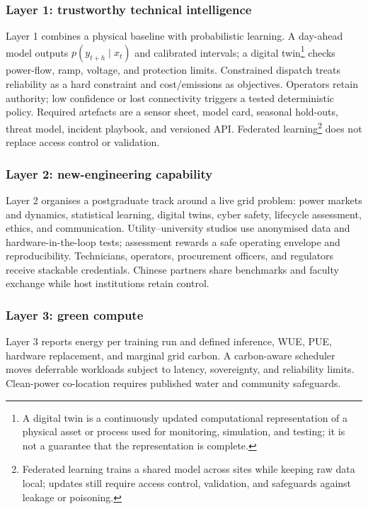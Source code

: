 \documentclass[12pt]{article}
\begin{document}
\subsubsection{Layer 1: trustworthy technical intelligence}
Layer 1 combines a physical baseline with probabilistic learning. A day-ahead model outputs $p(y_{t+h}\mid x_t)$ and calibrated intervals; a digital twin\footnote{A digital twin is a continuously updated computational representation of a physical asset or process used for monitoring, simulation, and testing; it is not a guarantee that the representation is complete.} checks power-flow, ramp, voltage, and protection limits. Constrained dispatch treats reliability as a hard constraint and cost/emissions as objectives. Operators retain authority; low confidence or lost connectivity triggers a tested deterministic policy. Required artefacts are a sensor sheet, model card, seasonal hold-outs, threat model, incident playbook, and versioned API. Federated learning\footnote{Federated learning trains a shared model across sites while keeping raw data local; updates still require access control, validation, and safeguards against leakage or poisoning.} does not replace access control or validation.

\subsubsection{Layer 2: new-engineering capability}
Layer 2 organises a postgraduate track around a live grid problem: power markets and dynamics, statistical learning, digital twins, cyber safety, lifecycle assessment, ethics, and communication. Utility--university studios use anonymised data and hardware-in-the-loop tests; assessment rewards a safe operating envelope and reproducibility. Technicians, operators, procurement officers, and regulators receive stackable credentials. Chinese partners share benchmarks and faculty exchange while host institutions retain control.

\subsubsection{Layer 3: green compute}
Layer 3 reports energy per training run and defined inference, WUE, PUE, hardware replacement, and marginal grid carbon. A carbon-aware scheduler moves deferrable workloads subject to latency, sovereignty, and reliability limits. Clean-power co-location requires published water and community safeguards.
\end{document}
